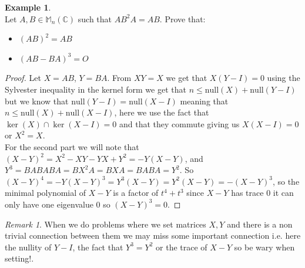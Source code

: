\documentclass[12pt]{article}
\newcommand{\Null}{\mathrm{null}}
\theoremstyle{definition}
\newtheorem*{example}{Example}
\theoremstyle{remark}
\newtheorem*{remark}{Remark}
\theoremstyle{plain}
\begin{document}
\begin{example}\leavevmode \\
    Let $A,B\in \mathbb{M}_n(\mathbb{C})$ such that $AB^2A=AB$. Prove that:
    \begin{itemize}
        \item $(AB)^2=AB$
        \item $(AB-BA)^3=O$
    \end{itemize}
\begin{proof}
        Let $X=AB$, $Y=BA$. From $XY=X$ we get that $X(Y-I)=0$ using the Sylvester inequality in the kernel form we get that $n\leq\Null(X)+\Null(Y-I)$ but we know that $\Null(Y-I)=\Null(X-I)$ meaning that $n\leq \Null(X)+\Null(X-I)$, here we use the fact that $\ker(X) \cap \ker(X-I)=0$ and that they commute giving us $X(X-I)=0$ or $X^2=X$.
    \\
    For the second part we will note that $(X-Y)^2=X^2-XY-YX+Y^2=-Y(X-Y)$, and $Y^3=BABABA=BX^2A=BXA=BABA=Y^2$. So $(X-Y)^4=-Y(X-Y)^3=Y^3(X-Y)=Y^2(X-Y)=-(X-Y)^3$, so the minimal polynomial of $X-Y$ is a factor of $t^4+t^3$ since $X-Y$ has trace $0$ it can only have one eigenvalue $0$ so $(X-Y)^3=0$.
    \end{proof}
    \begin{remark}
        When we do problems where we set matrices $X,Y$ and there is a non trivial connection between them we may miss some important connection i.e. here the nullity of $Y-I$, the fact that $Y^3=Y^2$ or the trace of $X-Y$ so be wary when setting!.
    \end{remark}

   
    \end{example}
\end{document}
